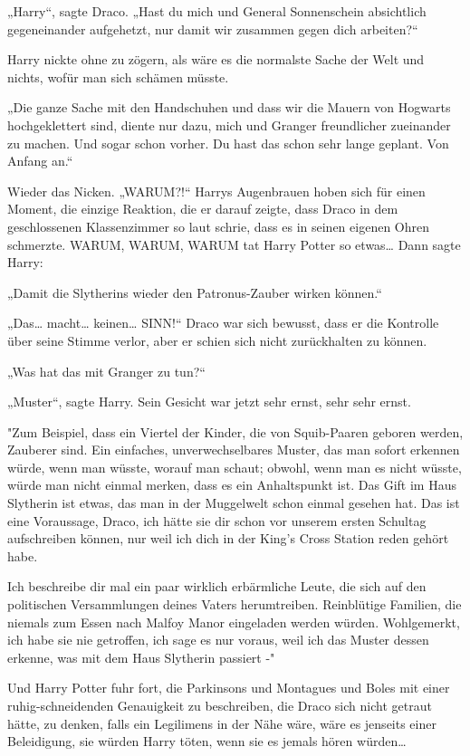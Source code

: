 {„Harry“, sagte Draco. „Hast du mich und General Sonnenschein absichtlich gegeneinander aufgehetzt, nur damit wir zusammen gegen dich arbeiten?“

Harry nickte ohne zu zögern, als wäre es die normalste Sache der Welt und nichts, wofür man sich schämen müsste.

„Die ganze Sache mit den Handschuhen und dass wir die Mauern von Hogwarts hochgeklettert sind, diente nur dazu, mich und Granger freundlicher zueinander zu machen. Und sogar schon vorher. Du hast das schon sehr lange geplant. Von Anfang an.“

Wieder das Nicken. „WARUM?!“ Harrys Augenbrauen hoben sich für einen Moment, die einzige Reaktion, die er darauf zeigte, dass Draco in dem geschlossenen Klassenzimmer so laut schrie, dass es in seinen eigenen Ohren schmerzte. WARUM, WARUM, WARUM tat Harry Potter so etwas… Dann sagte Harry:

„Damit die Slytherins wieder den Patronus-Zauber wirken können.“

„Das… macht… keinen… SINN!“ Draco war sich bewusst, dass er die Kontrolle über seine Stimme verlor, aber er schien sich nicht zurückhalten zu können.

„Was hat das mit Granger zu tun?“

„Muster“, sagte Harry. Sein Gesicht war jetzt sehr ernst, sehr sehr ernst.

"Zum Beispiel, dass ein Viertel der Kinder, die von Squib-Paaren geboren werden, Zauberer sind. Ein einfaches, unverwechselbares Muster, das man sofort erkennen würde, wenn man wüsste, worauf man schaut; obwohl, wenn man es nicht wüsste, würde man nicht einmal merken, dass es ein Anhaltspunkt ist. Das Gift im Haus Slytherin ist etwas, das man in der Muggelwelt schon einmal gesehen hat. Das ist eine Voraussage, Draco, ich hätte sie dir schon vor unserem ersten Schultag aufschreiben können, nur weil ich dich in der King's Cross Station reden gehört habe.

Ich beschreibe dir mal ein paar wirklich erbärmliche Leute, die sich auf den politischen Versammlungen deines Vaters herumtreiben. Reinblütige Familien, die niemals zum Essen nach Malfoy Manor eingeladen werden würden. Wohlgemerkt, ich habe sie nie getroffen, ich sage es nur voraus, weil ich das Muster dessen erkenne, was mit dem Haus Slytherin passiert -"

Und Harry Potter fuhr fort, die Parkinsons und Montagues und Boles mit einer ruhig-schneidenden Genauigkeit zu beschreiben, die Draco sich nicht getraut hätte, zu denken, falls ein Legilimens in der Nähe wäre, wäre es jenseits einer Beleidigung, sie würden Harry töten, wenn sie es jemals hören würden…

}
